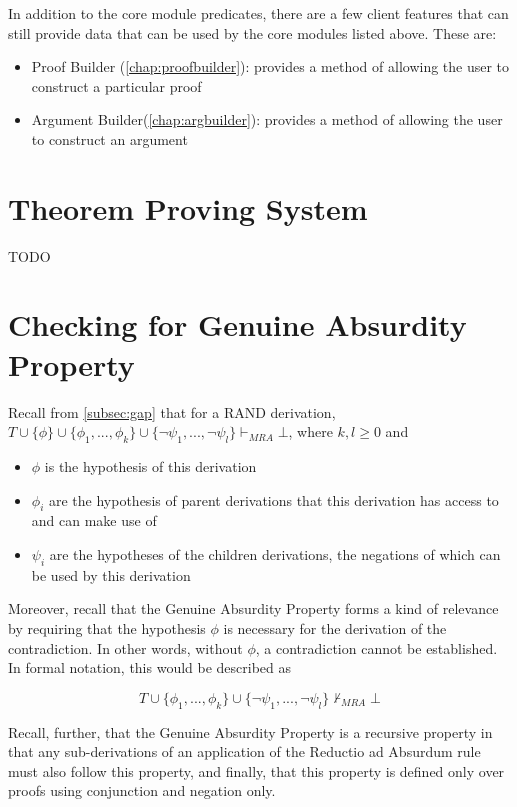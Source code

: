 \documentclass[11pt,twoside,a4paper]{report}
\begin{document}
In addition to the core module predicates, there are a few client features that can still provide data that can be used by the core modules listed above. These are:
\begin{itemize}
\item
Proof Builder (\autoref{chap:proofbuilder}): provides a method of allowing the user to construct a particular proof
\item
Argument Builder(\autoref{chap:argbuilder}): provides a method of allowing the user to construct an argument 
\end{itemize}

\chapter{Theorem Proving System}
\label{chap:prover}
TODO

\chapter{Checking for Genuine Absurdity Property}
\label{chap:gapcheck}
Recall from \autoref{subsec:gap} that for a RAND derivation, $T\cup\{\phi\}\cup\{\phi_1, ..., \phi_k\}\cup\{\neg\psi_1, ..., \neg\psi_l\}\vdash_{MRA}\bot$, where $k, l \geq 0$ and

\begin{itemize}
\item
$\phi$ is the hypothesis of this derivation
\item
$\phi_i$ are the hypothesis of parent derivations that this derivation has access to and can make use of
\item
$\psi_i$ are the hypotheses of the children derivations, the negations of which can be used by this derivation
\end{itemize}

Moreover, recall that the Genuine Absurdity Property forms a kind of relevance by requiring that the hypothesis $\phi$ is necessary for the derivation of the contradiction. In other words, without $\phi$, a contradiction cannot be established. In formal notation, this would be described as

\[T\cup\{\phi_1, ..., \phi_k\}\cup\{\neg\psi_1, ..., \neg\psi_l\}\nvdash_{MRA}\bot\]

Recall, further, that the Genuine Absurdity Property is a recursive property in that any sub-derivations of an application of the Reductio ad Absurdum rule must also follow this property, and finally, that this property is defined only over proofs using conjunction and negation only.
\end{document}
